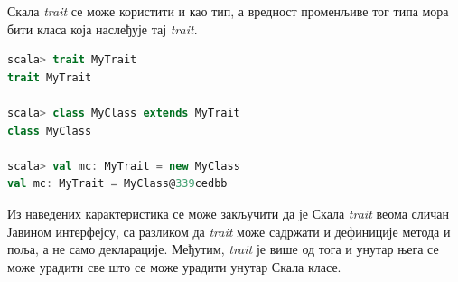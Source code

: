 \documentclass[12pt,oneside]{memoir}
\begin{document}
Скала \textit{trait} се може користити и као тип, а вредност променљиве тог типа мора бити класа која наслеђује тај \textit{trait}.

\begin{lstlisting}[language=Scala, caption={\textit{Trait} као тип}, label={lst:scala_oop_traits_types}]
scala> trait MyTrait
trait MyTrait

scala> class MyClass extends MyTrait
class MyClass

scala> val mc: MyTrait = new MyClass
val mc: MyTrait = MyClass@339cedbb
\end{lstlisting}

Из наведених карактеристика се може закључити да је Скала \textit{trait} веома сличан Јавином интерфејсу, са разликом да \textit{trait} може садржати и дефиниције метода и поља, а не само декларације. Међутим, \textit{trait} је више од тога и унутар њега се може урадити све што се може урадити унутар Скала класе.

%

%
%
%
%
\end{document}
